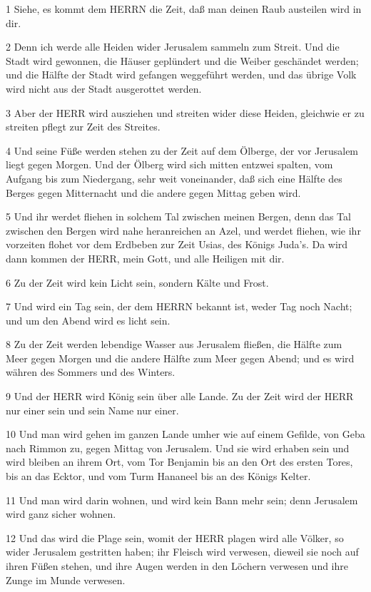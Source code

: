 \par 1 Siehe, es kommt dem HERRN die Zeit, daß man deinen Raub austeilen wird in dir.
\par 2 Denn ich werde alle Heiden wider Jerusalem sammeln zum Streit. Und die Stadt wird gewonnen, die Häuser geplündert und die Weiber geschändet werden; und die Hälfte der Stadt wird gefangen weggeführt werden, und das übrige Volk wird nicht aus der Stadt ausgerottet werden.
\par 3 Aber der HERR wird ausziehen und streiten wider diese Heiden, gleichwie er zu streiten pflegt zur Zeit des Streites.
\par 4 Und seine Füße werden stehen zu der Zeit auf dem Ölberge, der vor Jerusalem liegt gegen Morgen. Und der Ölberg wird sich mitten entzwei spalten, vom Aufgang bis zum Niedergang, sehr weit voneinander, daß sich eine Hälfte des Berges gegen Mitternacht und die andere gegen Mittag geben wird.
\par 5 Und ihr werdet fliehen in solchem Tal zwischen meinen Bergen, denn das Tal zwischen den Bergen wird nahe heranreichen an Azel, und werdet fliehen, wie ihr vorzeiten flohet vor dem Erdbeben zur Zeit Usias, des Königs Juda's. Da wird dann kommen der HERR, mein Gott, und alle Heiligen mit dir.
\par 6 Zu der Zeit wird kein Licht sein, sondern Kälte und Frost.
\par 7 Und wird ein Tag sein, der dem HERRN bekannt ist, weder Tag noch Nacht; und um den Abend wird es licht sein.
\par 8 Zu der Zeit werden lebendige Wasser aus Jerusalem fließen, die Hälfte zum Meer gegen Morgen und die andere Hälfte zum Meer gegen Abend; und es wird währen des Sommers und des Winters.
\par 9 Und der HERR wird König sein über alle Lande. Zu der Zeit wird der HERR nur einer sein und sein Name nur einer.
\par 10 Und man wird gehen im ganzen Lande umher wie auf einem Gefilde, von Geba nach Rimmon zu, gegen Mittag von Jerusalem. Und sie wird erhaben sein und wird bleiben an ihrem Ort, vom Tor Benjamin bis an den Ort des ersten Tores, bis an das Ecktor, und vom Turm Hananeel bis an des Königs Kelter.
\par 11 Und man wird darin wohnen, und wird kein Bann mehr sein; denn Jerusalem wird ganz sicher wohnen.
\par 12 Und das wird die Plage sein, womit der HERR plagen wird alle Völker, so wider Jerusalem gestritten haben; ihr Fleisch wird verwesen, dieweil sie noch auf ihren Füßen stehen, und ihre Augen werden in den Löchern verwesen und ihre Zunge im Munde verwesen.
